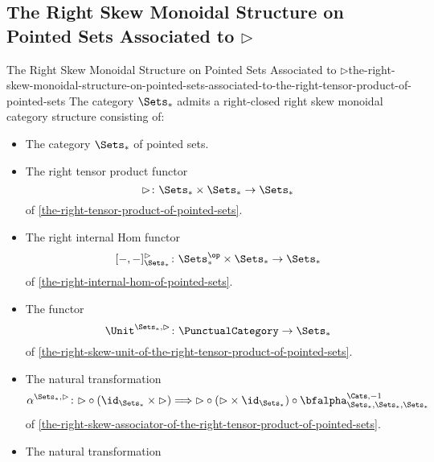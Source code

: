 \subsection{The Right Skew Monoidal Structure on Pointed Sets Associated to $\rhd$}\label{subsection-the-right-skew-monoidal-structure-on-pointed-sets-associated-to-the-right-tensor-product-of-pointed-sets-of-pointed-sets}
\begin{proposition}{The Right Skew Monoidal Structure on Pointed Sets Associated to $\rhd$}{the-right-skew-monoidal-structure-on-pointed-sets-associated-to-the-right-tensor-product-of-pointed-sets}%
    The category $\Sets_{*}$ admits a right-closed right skew monoidal category structure consisting of:
    \begin{itemize}
        \item{}The category $\Sets_{*}$ of pointed sets.
        \item{}The right tensor product functor
            \[
                \rhd%
                \colon%
                \Sets_{*}\times\Sets_{*}%
                \to%
                \Sets_{*}
            \]%
            of \cref{the-right-tensor-product-of-pointed-sets}.
        \item{}The right internal Hom functor
            \[
                [-,-]^{\rhd}_{\Sets_{*}}%
                \colon%
                \Sets^{\op}_{*}\times\Sets_{*}%
                \to%
                \Sets_{*}%
            \]%
            of \cref{the-right-internal-hom-of-pointed-sets}.
        \item{}The functor
            \[
                \Unit^{\Sets_{*},\rhd}
                \colon
                \PunctualCategory
                \to
                \Sets_{*}
            \]
            of \cref{the-right-skew-unit-of-the-right-tensor-product-of-pointed-sets}.
        \item{}The natural transformation
            \[
                \alpha^{\Sets_{*},\rhd}
                \colon
                {\rhd}\circ{(\id_{\Sets_{*}}\times{\rhd})}
                \Longrightarrow%
                {\rhd}\circ{({\rhd}\times\id_{\Sets_{*}})}\circ{\bfalpha^{\Cats,-1}_{\Sets_{*},\Sets_{*},\Sets_{*}}}%
            \]
            of \cref{the-right-skew-associator-of-the-right-tensor-product-of-pointed-sets}.
        \item{}The natural transformation

\end{itemize}
\end{proposition}
